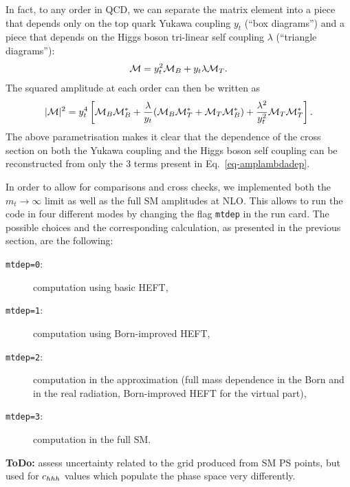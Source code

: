 In fact, to any order in QCD, we can separate the matrix element into a 
piece that depends only on the top quark Yukawa coupling $y_t$ (``box diagrams'') and a 
piece that depends on the Higgs boson tri-linear self coupling $\lambda$ (``triangle diagrams''):
\begin{align}
{\cal M} = y_t^2 {\cal M}_B + y_t \lambda {\cal M}_T.
\end{align}
The squared amplitude at each order can then be written as
\begin{align}
|{\cal M}|^2 = y_t^4 \left[ {\cal M}_B {\cal M}_B^* + \frac{\lambda}{y_t} ({\cal M}_B {\cal M}_T^* + {\cal M}_T {\cal M}_B^* ) +  \frac{\lambda^2}{y_t^2} {\cal M}_T {\cal M}_T^*  \right].
\end{align}
The above parametrisation makes it clear that the dependence of the cross section on
both the Yukawa coupling and the Higgs boson self coupling can be reconstructed
from only the 3 terms present in Eq.~\ref{eq-amplambdadep}.

In order to allow for comparisons and cross checks, we implemented
both the $m_t\to\infty$ limit as well as the full SM amplitudes at
NLO. This allows to run the code in four different modes by changing
the flag {\tt mtdep} in the \powhegbox{} run card. The possible
choices and the corresponding calculation, as presented in the
previous section, are the following:
\begin{description}
 \item[{\tt mtdep=0}:]{computation using basic HEFT,}
 \item[{\tt mtdep=1}:]{computation using Born-improved HEFT,}
 \item[{\tt mtdep=2}:]{computation in the approximation \ftapprox (full
   mass dependence in the Born and in the real radiation, Born-improved HEFT
   for the virtual part),}
 \item[{\tt mtdep=3}:]{computation in the full SM.}
\end{description}

\vspace*{1cm}


{\bf ToDo:} assess uncertainty related to the grid produced from SM PS points, but used for $c_{hhh}$ values which populate the phase space very differently.
